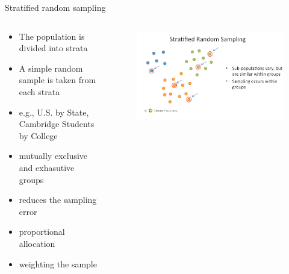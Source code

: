 \documentclass[10pt, compress]{beamer}
\begin{document}
\begin{frame}[t]{Stratified random sampling}
    \begin{columns}
        \begin{block}{}
            \begin{itemize}
                \item The population is divided into strata
                \item A simple random sample is taken from each strata
                \item e.g., U.S. by State, Cambridge Students by College
                \item mutually exclusive and exhasutive groups
                \item reduces the sampling error
                \item proportional allocation
                \item weighting the sample
            \end{itemize}
        \end{block}
        \begin{block}{}
            \begin{figure}
                \begin{center}
                    \includegraphics[scale=0.25]{img/Slide3.png}
                \end{center}
            \end{figure}
        \end{block}
    \end{columns}

\end{frame}
\end{document}
